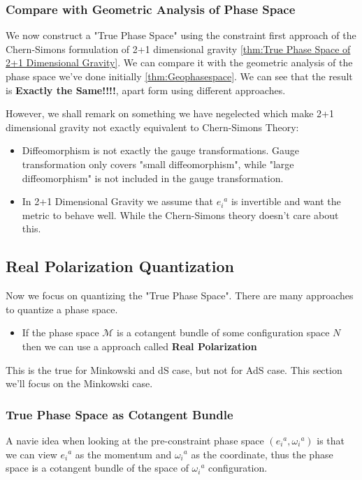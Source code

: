 \subsubsection{Compare with Geometric Analysis of Phase
Space}\label{sec:comparephase}

We now construct a "True Phase Space" using the constraint first
approach of the Chern-Simons formulation of 2+1 dimensional gravity
\cref{thm:True Phase Space of 2+1 Dimensional Gravity}. We can
compare it with the geometric analysis of the phase space we've done
initially \cref{thm:Geophasespace}.
We can see that the result is \textbf{Exactly the Same!!!!}, apart
form using different approaches.

However, we shall remark on something we have negelected which make
2+1 dimensional gravity not exactly equivalent to Chern-Simons Theory:
\begin{itemize}
  \item Diffeomorphism is not exactly the gauge transformations.
    Gauge transformation only covers "small diffeomorphism", while
    "large diffeomorphism" is not included in the gauge
    transformation.
  \item In 2+1 Dimensional Gravity we assume that $ e_i{}^a $ is
    invertible and want the metric to behave well. While the
    Chern-Simons theory doesn't care about this.
\end{itemize}

\subsection{Real Polarization Quantization}

Now we focus on quantizing the "True Phase Space". There are many
approaches to quantize a phase space.
\begin{itemize}
  \item If the phase space $ \mathcal{M} $ is a cotangent bundle of
    some configuration space $N$ then we can use a approach called
    \textbf{Real Polarization}
\end{itemize}
This is the true for Minkowski and dS case, but not for AdS case.
This section we'll focus on the Minkowski case.

\subsubsection{True Phase Space as Cotangent Bundle}

A navie idea when looking at the pre-constraint phase space $
(e_i{}^a, \omega_i{}^a) $ is that we can view $ e_i{}^a $ as the
momentum and $ \omega_i{}^a $ as the coordinate, thus the phase space
is a cotangent bundle of the space of $ \omega_i{}^a $ configuration.

